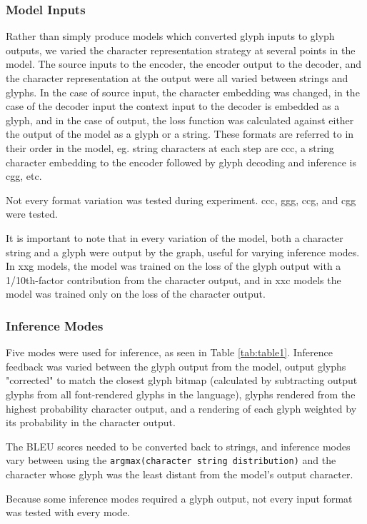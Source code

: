 \documentclass{article}
\begin{document}
\subsubsection{Model Inputs}
Rather than simply produce models which converted glyph inputs to glyph outputs, we varied the character representation strategy at several points in the model. The source inputs to the encoder, the encoder output to the decoder, and the character representation at the output were all varied between strings and glyphs. In the case of source input, the character embedding was changed, in the case of the decoder input the context input to the decoder is embedded as a glyph, and in the case of output, the loss function was calculated against either the output of the model as a glyph or a string. These formats are referred to in their order in the model, eg. string characters at each step are ccc, a string character embedding to the encoder followed by glyph decoding and inference is cgg, etc.

Not every format variation was tested during experiment. ccc, ggg, ccg, and cgg were tested. 

It is important to note that in every variation of the model, both a character string and a glyph were output by the graph, useful for varying inference modes. In xxg models, the model was trained on the loss of the glyph output with a 1/10th-factor contribution from the character output, and in xxc models the model was trained only on the loss of the character output.

\subsubsection{Inference Modes}
Five modes were used for inference, as seen in Table \ref{tab:table1}. Inference feedback was varied between the glyph output from the model, output glyphs "corrected" to match the closest glyph bitmap (calculated by subtracting output glyphs from all font-rendered glyphs in the language), glyphs rendered from the highest probability character output, and a rendering of each glyph weighted by its probability in the character output. 

The BLEU scores needed to be converted back to strings, and inference modes vary between using the \verb+argmax(character string distribution)+ and the character whose glyph was the least distant from the model's output character.

Because some inference modes required a glyph output, not every input format was tested with every mode.
\end{document}
